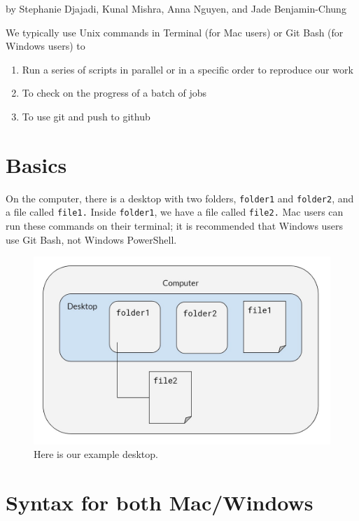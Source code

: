 \documentclass[]{book}
\providecommand{\tightlist}{%
  \setlength{\itemsep}{0pt}\setlength{\parskip}{0pt}}
\begin{document}
by Stephanie Djajadi, Kunal Mishra, Anna Nguyen, and Jade Benjamin-Chung

We typically use Unix commands in Terminal (for Mac users) or Git Bash
(for Windows users) to

\begin{enumerate}
\def\labelenumi{\arabic{enumi}.}
\tightlist
\item
  Run a series of scripts in parallel or in a specific order to
  reproduce our work
\item
  To check on the progress of a batch of jobs
\item
  To use git and push to github
\end{enumerate}

\section{Basics}\label{basics}

On the computer, there is a desktop with two folders, \texttt{folder1}
and \texttt{folder2}, and a file called \texttt{file1.} Inside
\texttt{folder1}, we have a file called \texttt{file2.} Mac users can
run these commands on their terminal; it is recommended that Windows
users use Git Bash, not Windows PowerShell.

\begin{figure}
\centering
\includegraphics{assets/images/ex-desktop.jpg}
\caption{Here is our example desktop.}
\end{figure}

\section{Syntax for both Mac/Windows}\label{syntax-for-both-macwindows}
\end{document}
